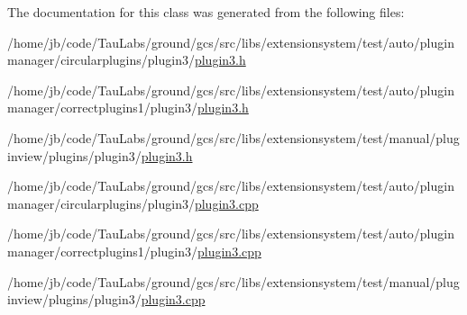\-The documentation for this class was generated from the following files\-:\begin{DoxyCompactItemize}
\item 
/home/jb/code/\-Tau\-Labs/ground/gcs/src/libs/extensionsystem/test/auto/pluginmanager/circularplugins/plugin3/\hyperlink{auto_2pluginmanager_2circularplugins_2plugin3_2plugin3_8h}{plugin3.\-h}\item 
/home/jb/code/\-Tau\-Labs/ground/gcs/src/libs/extensionsystem/test/auto/pluginmanager/correctplugins1/plugin3/\hyperlink{auto_2pluginmanager_2correctplugins1_2plugin3_2plugin3_8h}{plugin3.\-h}\item 
/home/jb/code/\-Tau\-Labs/ground/gcs/src/libs/extensionsystem/test/manual/pluginview/plugins/plugin3/\hyperlink{manual_2pluginview_2plugins_2plugin3_2plugin3_8h}{plugin3.\-h}\item 
/home/jb/code/\-Tau\-Labs/ground/gcs/src/libs/extensionsystem/test/auto/pluginmanager/circularplugins/plugin3/\hyperlink{auto_2pluginmanager_2circularplugins_2plugin3_2plugin3_8cpp}{plugin3.\-cpp}\item 
/home/jb/code/\-Tau\-Labs/ground/gcs/src/libs/extensionsystem/test/auto/pluginmanager/correctplugins1/plugin3/\hyperlink{auto_2pluginmanager_2correctplugins1_2plugin3_2plugin3_8cpp}{plugin3.\-cpp}\item 
/home/jb/code/\-Tau\-Labs/ground/gcs/src/libs/extensionsystem/test/manual/pluginview/plugins/plugin3/\hyperlink{manual_2pluginview_2plugins_2plugin3_2plugin3_8cpp}{plugin3.\-cpp}\end{DoxyCompactItemize}
